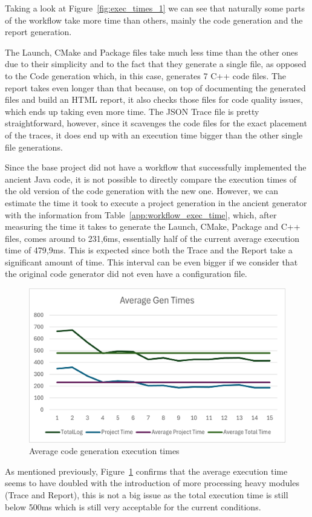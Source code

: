 Taking a look at Figure~\ref{fig:exec_times_1} we can see that naturally some parts of the workflow take more time than others, mainly the code generation and the report generation.

The Launch, CMake and Package files take much less time than the other ones due to their simplicity and to the fact that they generate a single file, as opposed to the Code generation which, in this case, generates 7 C++ code files. The report takes even longer than that because, on top of documenting the generated files and build an HTML report, it also checks those files for code quality issues, which ends up taking even more time. The JSON Trace file is pretty straightforward, however, since it scavenges the code files for the exact placement of the traces, it does end up with an execution time bigger than the other single file generations.

Since the base project did not have a workflow that successfully implemented the ancient Java code, it is not possible to directly compare the execution times of the old version of the code generation with the new one. However, we can estimate the time it took to execute a project generation in the ancient generator with the information from Table~\ref{app:workflow_exec_time}, which, after measuring the time it takes to generate the Launch, CMake, Package and C++ files, comes around to 231,6ms, essentially half of the current average execution time of 479,9ms. This is expected since both the Trace and the Report take a significant amount of time. This interval can be even bigger if we consider that the original code generator did not even have a configuration file.

\begin{figure}[htbp]
	\centering
	\includegraphics[width=\textwidth]{avg_exec_times_1.png}
	\caption{Average code generation execution times}
	\label{fig:avg_exec_times_1}
\end{figure}

As mentioned previously, Figure~\ref{fig:avg_exec_times_1} confirms that the average execution time seems to have doubled with the introduction of more processing heavy modules (Trace and Report), this is not a big issue as the total execution time is still below 500ms which is still very acceptable for the current conditions.



